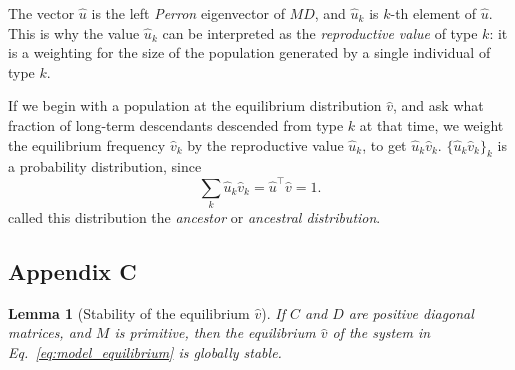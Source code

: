 \documentclass[12pt, twocolumn]{extarticle}
\newcommand*{\tr}{^\intercal}
\newtheorem{lemma}{Lemma}
\begin{document}
The vector $\hat u$ is the left \emph{Perron} eigenvector of $MD$, and $\hat u_k$ is $k$-th element of $\hat u$.
This is why the value $\hat u_k$ can be interpreted as the \emph{reproductive value} of type $k$: it is a weighting for the size of the population generated by a single individual of type $k$.

If we begin with a population at the equilibrium distribution $\hat v$,
and ask what fraction of long-term descendants descended from type $k$ at that time,
we weight the equilibrium frequency $\hat v_k$ by the reproductive value $\hat u_k$, to get $\hat u_k \hat v_k$.
$\{\hat u_k \hat v_k\}_{k}$ is a probability distribution, since
\begin{equation}
\sum_k {\hat u_k \hat v_k} = \hat u\tr \hat v = 1.
\end{equation}
\citet{Hermisson2002} called this distribution the \emph{ancestor} or \emph{ancestral distribution}.

\subsection*{Appendix C}\label{sec:AppC}

\begin{lemma}[Stability of the equilibrium $\hat v$]
If $C$ and $D$ are positive diagonal matrices, and $M$ is primitive, 
then the equilibrium $\hat v$ of the system in Eq.~\ref{eq:model_equilibrium} is globally stable.
\end{lemma}
\end{document}
